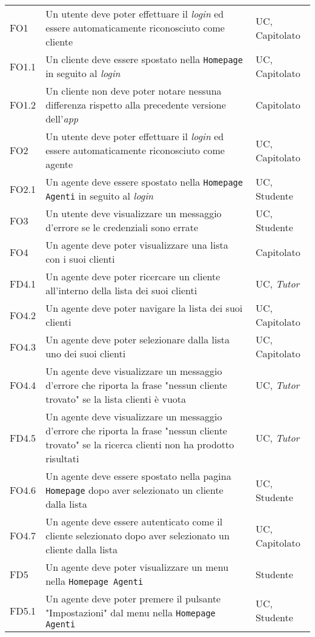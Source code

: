 \begin{center}
\begin{longtable}{|p{2.25cm}|p{7.75cm}|p{2.25cm}|}
    FO1 & Un utente deve poter effettuare il \textit{login} ed essere automaticamente riconosciuto come cliente & UC, Capitolato \\
    FO1.1 & Un cliente deve essere spostato nella \texttt{Homepage} in seguito al \textit{login} & UC, Capitolato \\
    FO1.2 & Un cliente non deve poter notare nessuna differenza rispetto alla precedente versione dell'\textit{app} & Capitolato \\
    FO2 & Un utente deve poter effettuare il \textit{login} ed essere automaticamente riconosciuto come agente & UC, Capitolato \\
    FO2.1 & Un agente deve essere spostato nella \texttt{Homepage Agenti} in seguito al \textit{login} & UC, Studente \\
    FO3 & Un utente deve visualizzare un messaggio d'errore se le credenziali sono errate & UC, Studente \\
    FO4 & Un agente deve poter visualizzare una lista con i suoi clienti & Capitolato \\
    FD4.1 & Un agente deve poter ricercare un cliente all'interno della lista dei suoi clienti & UC, \textit{Tutor} \\
    FO4.2 & Un agente deve poter navigare la lista dei suoi clienti & UC, Capitolato \\
    FO4.3 & Un agente deve poter selezionare dalla lista uno dei suoi clienti & UC, Capitolato \\
    FO4.4 & Un agente deve visualizzare un messaggio d'errore che riporta la frase "nessun cliente trovato" se la lista clienti è vuota & UC, \textit{Tutor} \\
    FD4.5 & Un agente deve visualizzare un messaggio d'errore che riporta la frase "nessun cliente trovato" se la ricerca clienti non ha prodotto risultati & UC, \textit{Tutor} \\
    FO4.6 & Un agente deve essere spostato nella pagina \texttt{Homepage} dopo aver selezionato un cliente dalla lista & UC, Studente \\
    FO4.7 & Un agente deve essere autenticato come il cliente selezionato dopo aver selezionato un cliente dalla lista & UC, Capitolato \\
    FD5 & Un agente deve poter visualizzare un menu nella \texttt{Homepage Agenti} & Studente \\
    FD5.1 & Un agente deve poter premere il pulsante "Impostazioni" dal menu nella \texttt{Homepage Agenti} & UC, Studente \\

\end{longtable}
\end{center}

